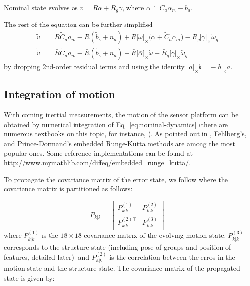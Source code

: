 \documentclass[letter,10pt]{article}
\newcommand{\asym}[1]{{\lbrack #1\rbrack}_\times{}}
\begin{document}
Nominal state evolves as $\dot{\bar v} = \bar R\bar\alpha + \bar R_g \gamma$, where $\bar\alpha\doteq\bar C_a \alpha_m - \bar b_a$.

The rest of the equation can be further simplified
\begin{align}
\dot{\tilde v} &= \bar R \tilde C_a a_m - \bar R(\tilde b_a + n_a) + \bar R\asym{\tilde\omega}\big(\bar\alpha  + \tilde C_a \alpha_m\big) - \bar R_g\asym{\gamma}\tilde\omega_g \\
\dot{\tilde v} &= \bar R \tilde C_a a_m - \bar R(\tilde b_a + n_a) - \bar R\asym{\bar\alpha}\tilde\omega - \bar R_g \asym{\gamma}\tilde\omega_g
\end{align}
by dropping 2nd-order residual terms and using the identity $\asym{a}b=-\asym{b}a$.




\subsection{Integration of motion}

With coming inertial measurements, the motion of the sensor platform can be obtained by numerical integration of Eq.~\eqref{eq:nominal-dynamics} (there are numerous textbooks on this topic, for instance, \cite{ascher1998computer}). As pointed out in \cite{ascher1998computer}, Fehlberg's, and Prince-Dormand's embedded Runge-Kutta methods are among the most popular ones. Some reference implementations can be found at \url{http://www.mymathlib.com/diffeq/embedded_runge_kutta/}.

To propagate the covariance matrix of the error state, we follow \cite{mourikis2007multi} where the covariance matrix is partitioned as follows:

\begin{equation}
    P_{k|k} = 
    \begin{bmatrix}
        P_{k|k}^{(1)} & P_{k|k}^{(2)} \\
        P_{k|k}^{(2)\top} & P_{k|k}^{(3)}
    \end{bmatrix}
    \label{eq:covariance-partition}
\end{equation}
where $P_{k|k}^{(1)}$ is the $18\times 18$ covariance matrix of the evolving motion state, $P_{k|k}^{(3)}$ corresponds to the structure state (including pose of groups and position of features, detailed later), and $P_{k|k}^{(2)}$  is the correlation between the erros in the motion state and the structure state. The covariance matrix of the propagated state is given by:
\end{document}
